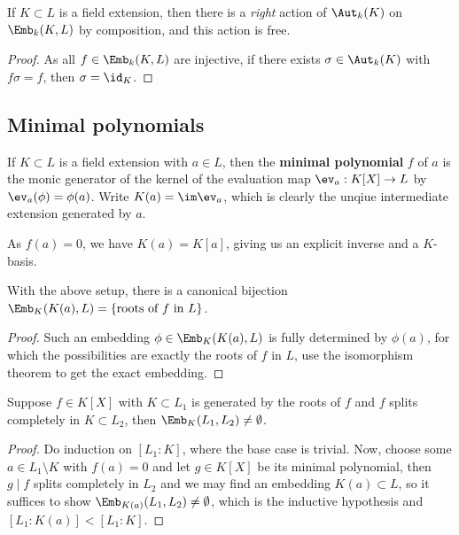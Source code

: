 \documentclass{article}
\begin{document}
\begin{proposition}[A2]
    If $K \subset L$ is a field extension, then there is a \textit{right} action of $\Aut_k(K)$ on $\Emb_k(K,L)$ by composition, and this action is free.
    \begin{proof}
        As all $f\in \Emb_k(K,L)$ are injective, if there exists $\sigma \in \Aut_k(K)$ with $f\sigma = f$, then $\sigma=\id_K$.
    \end{proof}
\end{proposition}

\subsection{Minimal polynomials}

\begin{definition}
    If $K\subset L$ is a field extension with $a\in L$, then the \textbf{minimal polynomial} $f$ of $a$ is the monic generator of the kernel of the evaluation map $\ev_a:K[X]\rightarrow L$ by $\ev_a(\phi) = \phi(a)$. Write $K(a) = \im\ev_a$, which is clearly the unqiue intermediate extension generated by $a$.
\end{definition}

As $f(a)=0$, we have $K(a)=K[a]$, giving us an explicit inverse and a $K$-basis.

\begin{lemma}
    With the above setup, there is a canonical bijection $\Emb_K(K(a),L) = \{\text{roots of $f$ in $L$}\}$.
    \begin{proof}
        Such an embedding $\phi\in \Emb_K(K(a),L)$ is fully determined by $\phi(a)$, for which the possibilities are exactly the roots of $f$ in $L$, use the isomorphism theorem to get the exact embedding.
    \end{proof}
\end{lemma}

\begin{proposition}
    Suppose $f\in K[X]$ with $K\subset L_1$ is generated by the roots of $f$ and $f$ splits completely in $K\subset L_2$, then $\Emb_K(L_1,L_2)\neq\emptyset$.
    \begin{proof}
        Do induction on $[L_1:K]$, where the base case is trivial. Now, choose some $a\in L_1\setminus K$ with $f(a)=0$ and let $g\in K[X]$ be its minimal polynomial, then $g\mid f$ splits completely in $L_2$ and we may find an embedding $K(a)\subset L$, so it suffices to show $\Emb_{K(a)}(L_1,L_2)\neq\emptyset$, which is the inductive hypothesis and $[L_1:K(a)]<[L_1:K]$.
    \end{proof}
\end{proposition}
\end{document}
